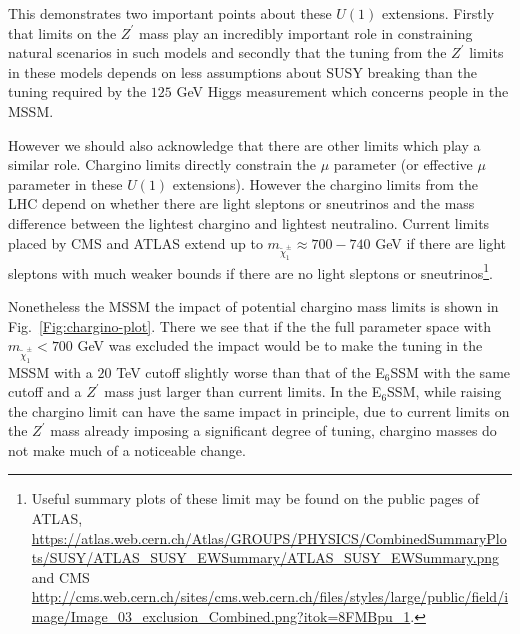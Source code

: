 \documentclass[preprint,amsmath,amssymb,aps,superscriptaddress,prd,showpacs,floatfix,nofootinbib]{revtex4-1}
\begin{document}
This demonstrates two important points about these $U(1)$
extensions. Firstly that limits on the $Z^\prime$ mass play an
incredibly important role in constraining natural scenarios in such
models and secondly that the tuning from the $Z^\prime$ limits in
these models depends on less assumptions about SUSY breaking than the
tuning required by the $125$ GeV Higgs measurement which concerns
people in the MSSM.

However we should also acknowledge that there are other limits which
play a similar role.  Chargino limits directly constrain the $\mu$
parameter (or effective $\mu$ parameter in these $U(1)$ extensions).
However the chargino limits from the LHC depend on whether there are
light sleptons or sneutrinos and the mass difference between the
lightest chargino and lightest neutralino.  Current limits placed by
CMS and ATLAS extend up to $m_{\tilde{\chi}^\pm_1} \approx 700-740$ GeV if
there are light sleptons\cite{Khachatryan:2014qwa,Aad:2014nua} with
much weaker bounds if there are no light sleptons or
sneutrinos\footnote{Useful summary plots of these limit may be found
  on the public pages of ATLAS,
  \url{https://atlas.web.cern.ch/Atlas/GROUPS/PHYSICS/CombinedSummaryPlots/SUSY/ATLAS_SUSY_EWSummary/ATLAS_SUSY_EWSummary.png}
  and CMS
  \url{http://cms.web.cern.ch/sites/cms.web.cern.ch/files/styles/large/public/field/image/Image_03_exclusion_Combined.png?itok=8FMBpu_1}.}.




Nonetheless the MSSM the impact of potential chargino mass limits is
shown in Fig.~\ref{Fig:chargino-plot}.  There we see that if the the
full parameter space with $m_{\tilde{\chi}^\pm_1} < 700$ GeV was excluded the
impact would be to make the tuning in the MSSM with a $20$ TeV cutoff
slightly worse than that of the E$_6$SSM with the same cutoff and a
$Z^\prime$ mass just larger than current limits. In the E$_6$SSM,
while raising the chargino limit can have the same impact in
principle, due to current limits on the $Z^\prime$ mass already
imposing a significant degree of tuning, chargino masses do not make
much of a noticeable change.
\end{document}
